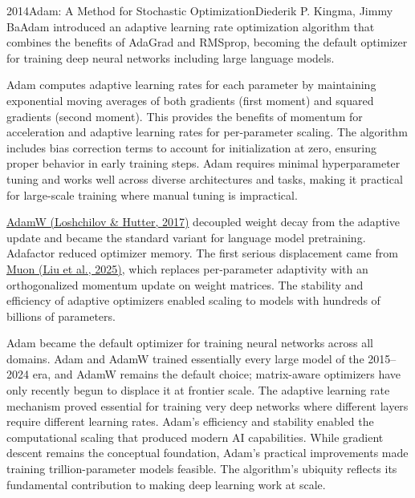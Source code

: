 
\begin{papersummary}{2014}{Adam: A Method for Stochastic Optimization}{Diederik P. Kingma, Jimmy Ba}{Adam introduced an adaptive learning rate optimization algorithm that combines the benefits of AdaGrad and RMSprop, becoming the default optimizer for training deep neural networks including large language models.}

Adam computes adaptive learning rates for each parameter by maintaining exponential moving averages of both gradients (first moment) and squared gradients (second moment). This provides the benefits of momentum for acceleration and adaptive learning rates for per-parameter scaling. The algorithm includes bias correction terms to account for initialization at zero, ensuring proper behavior in early training steps. Adam requires minimal hyperparameter tuning and works well across diverse architectures and tasks, making it practical for large-scale training where manual tuning is impractical.

\hyperref[paper:loshchilov-2017-adamw]{AdamW (Loshchilov \& Hutter, 2017)} decoupled weight decay from the adaptive update and became the standard variant for language model pretraining. Adafactor reduced optimizer memory. The first serious displacement came from \hyperref[paper:liu-2025-muon]{Muon (Liu et al., 2025)}, which replaces per-parameter adaptivity with an orthogonalized momentum update on weight matrices. The stability and efficiency of adaptive optimizers enabled scaling to models with hundreds of billions of parameters.

Adam became the default optimizer for training neural networks across all domains. Adam and AdamW trained essentially every large model of the 2015--2024 era, and AdamW remains the default choice; matrix-aware optimizers have only recently begun to displace it at frontier scale. The adaptive learning rate mechanism proved essential for training very deep networks where different layers require different learning rates. Adam's efficiency and stability enabled the computational scaling that produced modern AI capabilities. While gradient descent remains the conceptual foundation, Adam's practical improvements made training trillion-parameter models feasible. The algorithm's ubiquity reflects its fundamental contribution to making deep learning work at scale.

\end{papersummary}
